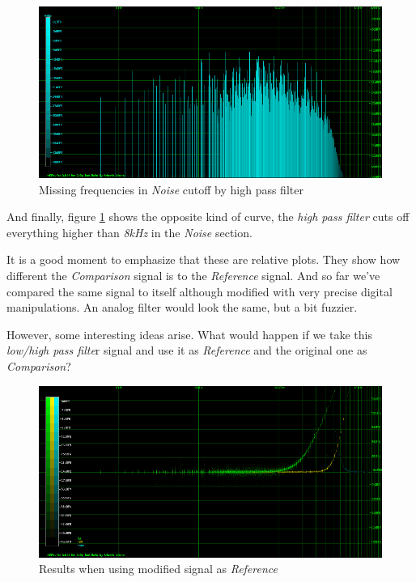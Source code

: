 \documentclass[10pt,a4paper]{report}
\begin{document}
\begin{figure}[H]
	\centering
	\includegraphics[width=1.0\linewidth]{images/interpretation/Plot4-6-Missing-Noise.png}
	\caption[Missing Noise]{Missing frequencies in \textit{Noise} cutoff by high pass filter}
	\label{fig:plot4-6-missing-noise}
\end{figure}

And finally, figure \ref{fig:plot4-6-missing-noise} shows the opposite kind of curve, the \textit{high pass filter} cuts off everything higher than \textit{8kHz} in the \textit{Noise} section.

It is a good moment to emphasize that these are relative plots. They show how different the \textit{Comparison} signal is to the \textit{Reference} signal. And so far we've compared the same signal to itself although modified with very precise digital manipulations. An analog filter would look the same, but a bit fuzzier. 

However, some interesting ideas arise. What would happen if we take this \textit{low/high pass filte}r signal and use it as \textit{Reference} and the original one as \textit{Comparison}?

\begin{figure}[H]
	\centering
	\includegraphics[width=1.0\linewidth]{images/interpretation/Plot4-7-Reversed.png}
	\caption[Reversed]{Results when using modified signal as \textit{Reference}}
	\label{fig:plot4-7-reversed}
\end{figure}
\end{document}
